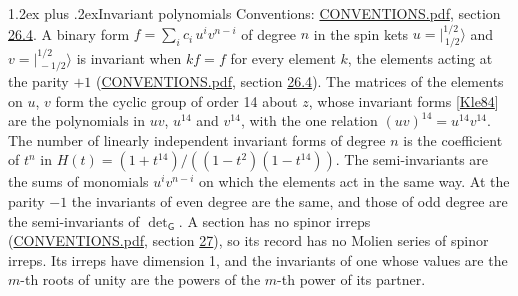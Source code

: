 \documentclass[10pt,a4paper]{article}
\makeatletter
\renewcommand\section{\@startsection{section}{1}{\z@}{-3ex plus -1ex minus -.2ex}%
  {1.2ex plus .2ex}{\normalfont\large\sffamily\bfseries\color{parttitle}}}
\numberwithin{equation}{section}
\newcommand{\grp}[1]{\mathsf{#1}}
\newcommand{\jm}[2]{\bigl\lvert{}^{#1}_{\,#2}\bigr\rangle}
\makeatother
\begin{document}
\section{Invariant polynomials}\label{s:invariants}
Conventions: \href{../../CONVENTIONS.pdf}{CONVENTIONS.pdf}, section \href{../../CONVENTIONS.pdf\#conv.26.4}{26.4}.
\leavevmode\label{n:local.spinor.uv}\label{n:local.binary.form}A binary form $f = \sum_i c_i\, u^i v^{n-i}$ of degree $n$ in the spin kets $u = \jm{1/2}{1/2}$ and $v = \jm{1/2}{-1/2}$ is invariant when $k f = f$ for every element $k$, the elements acting at the parity $+1$ (\href{../../CONVENTIONS.pdf}{CONVENTIONS.pdf}, section \href{../../CONVENTIONS.pdf\#conv.26.4}{26.4}).
The matrices of the elements on $u$, $v$ form the cyclic group of order 14 about $z$, whose invariant forms [\href{../../../REFERENCES.pdf\#ref.Kle84}{Kle84}] are the polynomials in $uv$, $u^{14}$ and $v^{14}$, with the one relation $(uv)^{14} = u^{14}v^{14}$. \label{n:function.hilbert}The number of linearly independent invariant forms of degree $n$ is the coefficient of $t^n$ in $H(t) = (1 + t^{14})/((1-t^{2})(1-t^{14}))$. The semi-invariants are the sums of monomials $u^i v^{n-i}$ on which the elements act in the same way. At the parity $-1$ the invariants of even degree are the same, and those of odd degree are the semi-invariants of $\det_{\grp{G}}$. A section has no spinor irreps (\href{../../CONVENTIONS.pdf}{CONVENTIONS.pdf}, section \href{../../CONVENTIONS.pdf\#conv.27}{27}), so its record has no Molien series of spinor irreps. Its irreps have dimension 1, and the invariants of one whose values are the $m$-th roots of unity are the powers of the $m$-th power of its partner.
\end{document}

